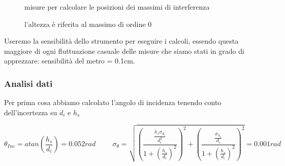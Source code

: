\documentclass{article}
\theoremstyle{definition}
\begin{document}
\begin{figure}[!htbp]
    	\captionsetup{labelformat=empty}
    	\caption{misure per calcolare le posizioni dei massimi di interferenza}
             \caption{l'altezza è riferita al massimo di ordine 0}
    \end{figure}

\noindent Useremo la sensibilità dello strumento per eseguire i calcoli, essendo questa maggiore di ogni fluttuazione casuale delle misure che siamo stati in grado di apprezzare: sensibilità del metro = 0.1cm.


\subsubsection{Analisi dati}
Per prima cosa abbiamo calcolato l'angolo di incidenza tenendo conto dell'incertezza su \(d_{i}\) e \(h_{s}\)

\[\theta_{Inc} = atan \left (\frac{h_{s}}{d_{i}} \right ) = 0.052 rad \hspace{1cm}
\sigma_{\theta}= \sqrt{  \left (\frac{\frac{ h_{s} \sigma_{d_{i}} }{ d_{i}^{2} } }{ 1+ \left ( \frac{h_{s}}{d_{i}} \right )  ^{2} } \right ) ^{2}  + \left (  \frac{\frac{\sigma_{h_{s}}}{d_{i}}}{ 1+\left ( \frac{h_{s}}{d_{i}} \right )  ^{2} } \right )   ^{2} } = 0.001 rad\]
\end{document}
